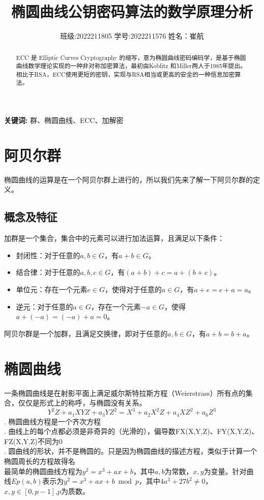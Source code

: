 \documentclass[a4paper]{article}
\title{\heiti\zihao{3} 椭圆曲线公钥密码算法的数学原理分析}
\date{班级:2022211805  学号:2022211576  姓名：崔航}
\providecommand{\keywords}[1]
{
    \small	
    \textbf{关键词:} #1
}
\providecommand{\keywords}[1]
{
  \small	
  \textbf{关键词:} #1
}
\begin{document}
    \maketitle
\begin{abstract}
ECC 是 Elliptic Curves Cryptography 的缩写，意为椭圆曲线密码编码学，是基于椭圆曲线数学理论实现的一种非对称加密算法，最初由Koblitz
和Miller两人于1985年提出。相比于RSA，ECC使用更短的密钥，实现与RSA相当或更高的安全的一种信息加密算法。
\end{abstract}
\keywords{群、椭圆曲线、ECC、加解密}
\tableofcontents
\section{阿贝尔群}
椭圆曲线的运算是在一个阿贝尔群上进行的，所以我们先来了解一下阿贝尔群的定义。
\subsection{概念及特征}
加群是一个集合，集合中的元素可以进行加法运算，且满足以下条件：
\begin{itemize}
\item 封闭性：对于任意的$a,b\in G$，有$a+b\in G$。
\item 结合律：对于任意的$a,b,c\in G$，有$(a+b)+c=a+(b+c)$。
\item 单位元：存在一个元素$e\in G$，使得对于任意的$a\in G$，有$a+e=e+a=a$。
\item 逆元：对于任意的$a\in G$，存在一个元素$-a\in G$，使得$a+(-a)=(-a)+a=0$。
\end{itemize}
阿贝尔群是一个加群，且满足交换律，即对于任意的$a,b\in G$，有$a+b=b+a$。



\section{椭圆曲线}
一条椭圆曲线是在射影平面上满足威尔斯特拉斯方程（Weierstrass）所有点的集合，仅仅是形式上的称呼，与椭圆没有关系。
$$Y^{2}Z+a_{1}XYZ+a_{3}YZ^{2}=X^{3}+a_{2}X^{2}Z+a_{4}XZ^{2}+a_{6}Z^{3}$$
. 椭圆曲线方程是一个齐次方程\\
. 曲线上的每个点都必须是非奇异的（光滑的），偏导数FX(X,Y,Z)、FY(X,Y,Z)、FZ(X,Y,Z)不同为0\\
. 圆曲线的形状，并不是椭圆的。只是因为椭圆曲线的描述方程，类似于计算一个椭圆周长的方程故得名\\

最简单的椭圆曲线方程为$y^2=x^3+ax+b$，其中$a,b$为常数，$x,y$为变量。针对曲线$Ep(a,b)$表示为$y^2=x^3+ax+b\bmod p$，其中$4a^{3}+27b^{2}\not =0$，$x,y\in [0,p-1]$,$p$为质数。\\
\\
\end{document}

